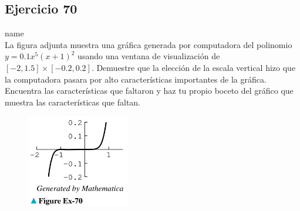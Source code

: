 \documentclass[12pt]{article}
\begin{document}
\subsection{Ejercicio 70} name \\

La figura adjunta muestra una gráfica generada por computadora del polinomio $y = 0.1x^5 (x + 1)^2$ usando una ventana de visualización de $[−2, 1.5] \times [−0.2, 0.2]$. Demuestre que la elección de la escala vertical hizo que la computadora pasara por alto características importantes de la gráfica. Encuentra las características que faltaron y haz tu propio boceto del gráfico que muestra las características que faltan.
\begin{figure}[H]
\centering
\includegraphics[width=0.4\textwidth]{../img/img_Lista3/2_70.png}
\end{figure}
\end{document}
